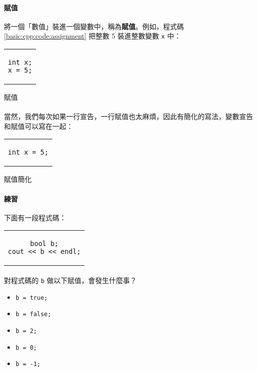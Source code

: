 \documentclass[12pt,a4paper,oneside]{report}
\begin{document}
\begin{CJK}{UTF8}{bkai}
\paragraph{賦值}將一個「數值」裝進一個變數中，稱為\textbf{賦值}。例如，程式碼 \ref{basic:cpp:code:assignment} 把整數 5 裝進整數變數 \lstinline!x! 中：

\begin{code}[h!]
\centering
\begin{tabular}{c}
\begin{lstlisting}
int x;
x = 5;
\end{lstlisting}
\end{tabular}
\caption{賦值}
\label{basic:cpp:code:assignment}
\end{code}

\paragraph{}當然，我們每次如果一行宣告，一行賦值也太麻煩，因此有簡化的寫法，變數宣告和賦值可以寫在一起：

\begin{code}[h!]
\centering
\begin{tabular}{c}
\begin{lstlisting}
int x = 5;
\end{lstlisting}
\end{tabular}
\caption{賦值簡化}
\label{basic:cpp:code:assignment:simple}
\end{code}

\paragraph{練習}下面有一段程式碼：

\begin{code}[h!]
\centering
\begin{tabular}{c}
\begin{lstlisting}
bool b;
cout << b << endl;
\end{lstlisting}
\end{tabular}
\label{basic:cpp:code:practice:bool}
\end{code}

\paragraph{}對程式碼的 \lstinline!b! 做以下賦值，會發生什麼事？
\begin{itemize}
\item \lstinline!b = true;!
\item \lstinline!b = false;!
\item \lstinline!b = 2;!
\item \lstinline!b = 0;!
\item \lstinline!b = -1;!
\end{itemize}
  

\end{CJK}
\end{document}
